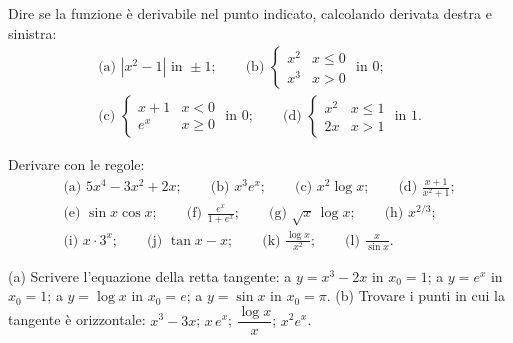 \begin{esercizio}[\liv{2}]
Dire se la funzione è derivabile nel punto indicato, calcolando derivata destra e sinistra:
\begin{gather*}
\text{(a) }|x^2-1|\text{ in }\pm1;\qquad \text{(b) }\begin{cases}x^2 & x\le0\\ x^3 & x>0\end{cases}\text{ in }0;\\ \text{(c) }\begin{cases}x+1 & x<0\\ e^x & x\ge0\end{cases}\text{ in }0;\qquad \text{(d) }\begin{cases}x^2 & x\le1\\ 2x & x>1\end{cases}\text{ in }1.
\end{gather*}
\end{esercizio}

\begin{esercizio}[\liv{1}]
Derivare con le regole:
\begin{gather*}
\text{(a) }5x^4-3x^2+2x;\qquad \text{(b) }x^3e^x;\qquad \text{(c) }x^2\log x;\qquad \text{(d) }\frac{x+1}{x^2+1};\\
\text{(e) }\sin x\cos x;\qquad \text{(f) }\frac{e^x}{1+e^x};\qquad \text{(g) }\sqrt x\,\log x;\qquad \text{(h) }x^{2/3};\\
\text{(i) }x\cdot3^x;\qquad \text{(j) }\tan x-x;\qquad \text{(k) }\frac{\log x}{x^2};\qquad \text{(l) }\frac x{\sin x}.
\end{gather*}
\end{esercizio}

\begin{esercizio}[\liv{2}]
(a) Scrivere l'equazione della retta tangente: a $y=x^3-2x$ in $x_0=1$; a $y=e^x$ in $x_0=1$; a $y=\log x$ in $x_0=e$; a $y=\sin x$ in $x_0=\pi$. (b) Trovare i punti in cui la tangente è orizzontale: $x^3-3x$; $x\,e^x$; $\dfrac{\log x}x$; $x^2e^x$.
\end{esercizio}

